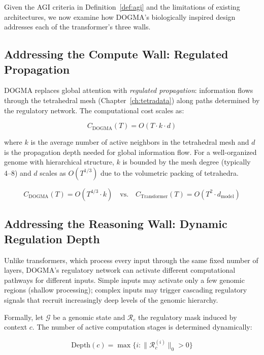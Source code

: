 Given the AGI criteria in Definition~\ref{def:agi} and the limitations of existing architectures, we now examine how DOGMA's biologically inspired design addresses each of the transformer's three walls.

\subsection{Addressing the Compute Wall: Regulated Propagation}

DOGMA replaces global attention with \emph{regulated propagation}: information flows through the tetrahedral mesh (Chapter~\ref{ch:tetradata}) along paths determined by the regulatory network. The computational cost scales as:

\begin{equation}
C_{\text{DOGMA}}(T) = O(T \cdot k \cdot d)
\label{eq:dogma-cost}
\end{equation}

where $k$ is the average number of active neighbors in the tetrahedral mesh and $d$ is the propagation depth needed for global information flow. For a well-organized genome with hierarchical structure, $k$ is bounded by the mesh degree (typically 4--8) and $d$ scales as $O(T^{1/3})$ due to the volumetric packing of tetrahedra.

\begin{equation}
C_{\text{DOGMA}}(T) = O(T^{4/3} \cdot k) \quad \text{vs.} \quad C_{\text{Transformer}}(T) = O(T^2 \cdot d_{\text{model}})
\label{eq:cost-comparison}
\end{equation}

\subsection{Addressing the Reasoning Wall: Dynamic Regulation Depth}

Unlike transformers, which process every input through the same fixed number of layers, DOGMA's regulatory network can activate different computational pathways for different inputs. Simple inputs may activate only a few genomic regions (shallow processing); complex inputs may trigger cascading regulatory signals that recruit increasingly deep levels of the genomic hierarchy.

Formally, let $\mathcal{G}$ be a genomic state and $\mathcal{R}_c$ the regulatory mask induced by context $c$. The number of active computation stages is determined dynamically:

\begin{equation}
\text{Depth}(c) = \max \bigl\{ i : \|\mathcal{R}_c^{(i)}\|_0 > 0 \bigr\}
\label{eq:dynamic-depth}
\end{equation}


